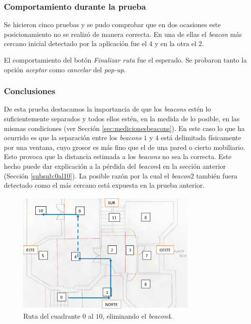 \subsubsection*{Comportamiento durante la prueba}

Se hicieron cinco pruebas y se pudo comprobar que en dos ocasiones este posicionamiento no se realizó de manera correcta. En una de ellas el \textit{beacon} más cercano inicial detectado por la aplicación fue el $4$ y en la otra el $2$.

El comportamiento del botón \textit{Finalizar ruta} fue el esperado. Se probaron tanto la opción \textit{aceptar} como \textit{cancelar} del \textit{pop-up}.


\subsubsection*{Conclusiones}

De esta prueba destacamos la importancia de que los \textit{beacons} estén lo suficientemente separados y todos ellos estén, en la medida de lo posible, en las mismas condiciones (ver Sección \ref{sec:medicionesbeacons}). En este caso lo que ha ocurrido es que la separación entre los \textit{beacons} $1$ y $4$ está delimitada físicamente por una ventana, cuyo grosor es más fino que el de una pared o cierto mobiliario. Esto provoca que la distancia estimada a los \textit{beacons} no sea la correcta. Este hecho puede dar explicación a la pérdida del \textit{beacon$4$} en la sección anterior (Sección \ref{subsub:0al10}). La posible razón por la cual el \textit{beacon$2$} también fuera detectado como el más cercano está expuesta en la prueba anterior.


\begin{figure}[t]
	\centering
	\includegraphics[width=0.8\textwidth]{Imagenes/Evaluacion/del0al10sin4}
	\caption{Ruta del cuadrante $0$ al $10$, eliminando el \textit{beacon$4$}.}
	\label{fig:del0al10sin4}
\end{figure}


